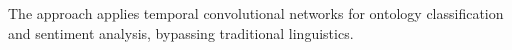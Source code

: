 The approach applies temporal convolutional networks for ontology classification and sentiment analysis, bypassing traditional linguistics.